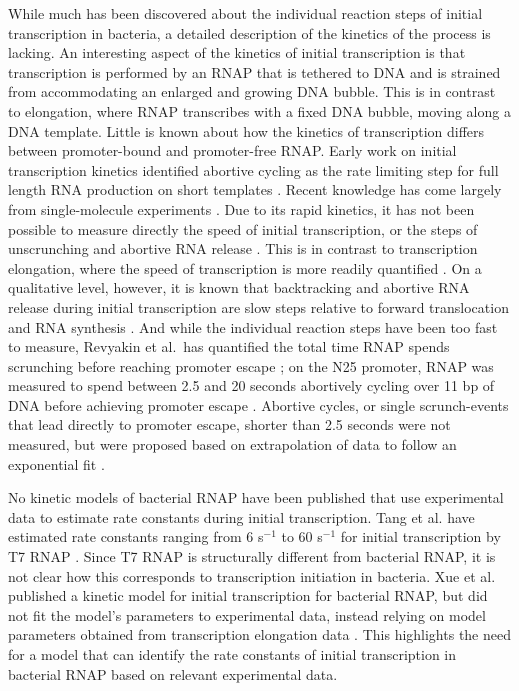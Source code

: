 While much has been discovered about the individual reaction steps of initial
transcription in bacteria, a detailed description of the kinetics of the
process is lacking. An interesting aspect of the kinetics of initial
transcription is that transcription is performed by an RNAP that is tethered to
DNA and is strained from accommodating an enlarged and growing DNA bubble.
This is in contrast to elongation, where RNAP transcribes with a fixed DNA
bubble, moving along a DNA template. Little is known about how the kinetics of
transcription differs between promoter-bound and promoter-free RNAP. Early
work on initial transcription kinetics identified abortive cycling as the rate
limiting step for full length RNA production on short templates
\cite{stefano_lac_1979, munson_abortive_1981}. Recent knowledge has come
largely from single-molecule experiments \cite{revyakin_abortive_2006,
kapanidis_initial_2006, tang_real-time_2009, kapanidis_retention_2005,
margeat_direct_2006}. Due to its rapid kinetics, it has not been possible to
measure directly the speed of initial transcription, or the steps of
unscrunching and abortive RNA release \cite{revyakin_abortive_2006,
margeat_direct_2006}. This is in contrast to transcription elongation, where
the speed of transcription is more readily quantified \cite{wang_force_1998,
tolic-norrelykke_diversity_2004, bai_mechanochemical_2007}. On a qualitative
level, however, it is known that backtracking and abortive RNA release during
initial transcription are slow steps relative to forward translocation and RNA
synthesis \cite{revyakin_abortive_2006, margeat_direct_2006}. And while the
individual reaction steps have been too fast to measure, Revyakin et al.\ has
quantified the total time RNAP spends scrunching before reaching promoter
escape \cite{revyakin_abortive_2006}; on the N25 promoter, RNAP was measured
to spend between 2.5 and 20 seconds abortively cycling over 11 bp of DNA before
achieving promoter escape \cite{revyakin_abortive_2006}. Abortive cycles, or
single scrunch-events that lead directly to promoter escape, shorter than 2.5
seconds were not measured, but were proposed based on extrapolation of data to
follow an exponential fit \cite{revyakin_abortive_2006}.

No kinetic models of bacterial RNAP have been published that use experimental
data to estimate rate constants during initial transcription. Tang et al.
have estimated rate constants ranging from 6 s$^{-1}$ to 60 s$^{-1}$ for
initial transcription by T7 RNAP \cite{tang_real-time_2009}. Since T7 RNAP is
structurally different from bacterial RNAP, it is not clear how this
corresponds to transcription initiation in bacteria. Xue et al. published a
kinetic model for initial transcription for bacterial RNAP, but did not fit
the model's parameters to experimental data, instead relying on model
parameters obtained from transcription elongation data
\cite{xue_kinetic_2008}. This highlights the need for a model that can
identify the rate constants of initial transcription in bacterial RNAP based
on relevant experimental data.

